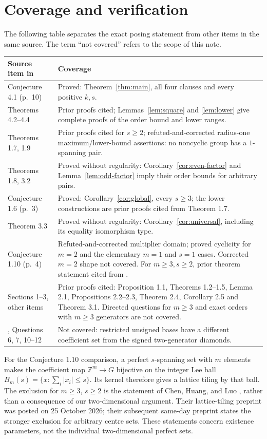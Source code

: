 \documentclass[11pt]{article}
\newcommand{\Z}{\mathbb Z}
\begin{document}
\section{Coverage and verification}
The following table separates the exact posing statement from other items
in the same source. The term ``not covered'' refers to the scope of this note.
\begin{center}\small
\begin{tabular}{p{.26\linewidth}p{.65\linewidth}}
\hline
Source item in \cite{BB}&Coverage\\ \hline
Conjecture 4.1 (p.~10)&Proved: Theorem~\ref{thm:main}, all four clauses and every positive $k,s$.\\
Theorems 4.2--4.4&Prior proofs cited; Lemmas~\ref{lem:square} and \ref{lem:lower}
give complete proofs of the order bound and lower ranges.\\
Theorems 1.7, 1.9&Prior proofs cited for $s\ge2$;
refuted-and-corrected radius-one maximum/lower-bound assertions:
no noncyclic group has a $1$-spanning pair.\\
Theorems 1.8, 3.2&Proved without regularity: Corollary~\ref{cor:even-factor}
and Lemma~\ref{lem:odd-factor} imply their order bounds for arbitrary pairs.\\
Conjecture 1.6 (p.~3)&Proved: Corollary~\ref{cor:global}, every $s\ge3$;
the lower constructions are prior proofs cited from Theorem 1.7.\\
Theorem 3.3&Proved without regularity: Corollary~\ref{cor:universal},
including its equality isomorphism type.\\
Conjecture 1.10 (p.~4)&Refuted-and-corrected multiplier domain;
proved cyclicity for $m=2$ and the elementary $m=1$ and $s=1$ cases.
Corrected $m=2$ shape not covered. For $m\ge3,s\ge2$, prior theorem
statement cited from \cite[Theorem 1.1]{CHL}.\\
Sections 1--3, other items&Prior proofs cited: Proposition 1.1,
Theorems 1.2--1.5, Lemma 2.1, Propositions 2.2--2.3,
Theorem 2.4, Corollary 2.5 and Theorem 3.1.
Directed questions for $m\ge3$ and exact orders with $m\ge3$
generators are not covered.\\
\cite{BBJ}, Questions 6, 7, 10--12&Not covered: restricted unsigned bases
have a different coefficient set from the signed two-generator diamonds.\\ \hline
\end{tabular}
\end{center}

For the Conjecture 1.10 comparison, a perfect $s$-spanning set with $m$
elements makes the coefficient map $\Z^m\to G$ bijective on the integer
Lee ball $B_m(s)=\{x:\sum_i|x_i|\le s\}$. Its kernel therefore gives a
lattice tiling by that ball. The exclusion for $m\ge3$, $s\ge2$ is the
statement of Chen, Huang, and Luo \cite[Theorem 1.1]{CHL}, rather than
a consequence of our two-dimensional argument. Their lattice-tiling
preprint was posted on 25 October 2026; their subsequent same-day
preprint \cite[Theorem 1.1]{CHLA} states the stronger exclusion for
arbitrary centre sets. These statements concern existence parameters,
not the individual two-dimensional perfect sets.
\end{document}
